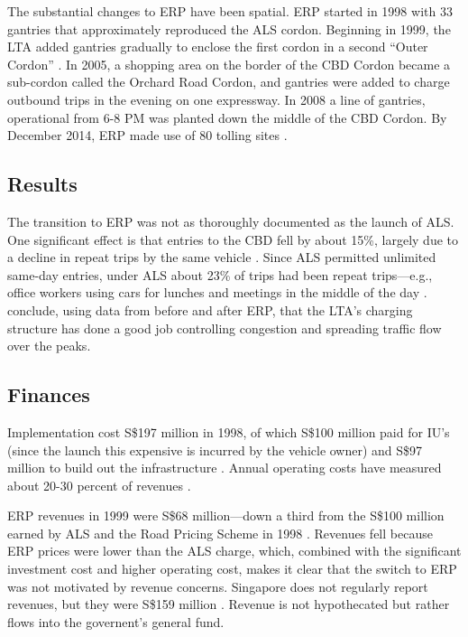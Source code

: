 The substantial changes to ERP have been spatial. ERP started in 1998 with 33 gantries that approximately reproduced the ALS cordon. Beginning in 1999, the LTA added gantries gradually to enclose the first cordon in a second ``Outer Cordon'' \citep{Chin2010}. In 2005, a shopping area on the border of the CBD Cordon became a sub-cordon called the Orchard Road Cordon, and gantries were added to charge outbound trips in the evening on one expressway. In 2008 a line of gantries, operational from 6-8 PM was planted down the middle of the CBD Cordon. By December 2014, ERP made use of 80 tolling sites \citep[p. 406]{Chu2015}.

\subsection{Results}

The transition to ERP was not as thoroughly documented as the launch of ALS. One significant effect is that entries to the CBD fell by about 15\%, largely due to a decline in repeat trips by the same vehicle \citep{Menon2000}. Since ALS permitted unlimited same-day entries, under ALS about 23\% of trips had been repeat trips---e.g., office workers using cars for lunches and meetings in the middle of the day \citep[p. 23]{Chin2010}. \citet{Olszewski2005} conclude, using data from before and after ERP, that the LTA's charging structure has done a good job controlling congestion and spreading traffic flow over the peaks.

\subsection{Finances}

Implementation cost S\$197 million in 1998, of which S\$100 million paid for IU's (since the launch this expensive is incurred by the vehicle owner) and S\$97 million to build out the infrastructure \citep{Santos2004}. Annual operating costs have measured about 20-30 percent of revenues \citep{Chin2010}.

ERP revenues in 1999 were S\$68 million---down a third from the S\$100 million earned by ALS and the Road Pricing Scheme in 1998 \citep[p. 34]{Goh2002}. Revenues fell because ERP prices were lower than the ALS charge, which, combined with the significant investment cost and higher operating cost, makes it clear that the switch to ERP was not motivated by revenue concerns. Singapore does not regularly report revenues, but they were S\$159 million \citep{Chen2012}. Revenue is not hypothecated but rather flows into the governent's general fund.

